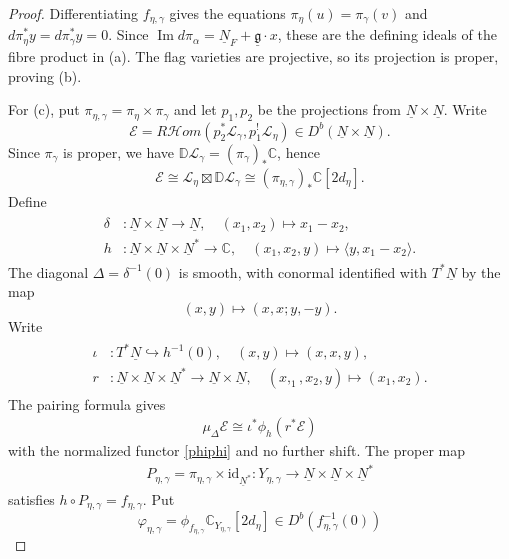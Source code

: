\documentclass[11pt,reqno]{amsart}
\theoremstyle{definition}
\theoremstyle{remark}
\def\bbC{\mathbb C}
\def\dN{\underline N}
\def\dg{\underline{\mathfrak g}}
\def\calE{\mathcal E}
\begin{document}
\begin{proof}
Differentiating $f_{\eta,\gamma}$ gives the equations
$\pi_\eta(u)=\pi_\gamma(v)$ and
$d\pi_\eta^*y=d\pi_\gamma^*y=0$.
Since $\operatorname{Im}d\pi_\alpha=\dN_F+\dg\cdot x$,
these are the defining ideals of the fibre product in (a).
The flag varieties are projective, so its projection is proper,
proving (b).

For (c), put $\pi_{\eta,\gamma}=\pi_\eta\times\pi_\gamma$ and
let $p_1,p_2$ be the projections from $\dN\times\dN$.
Write 
$$\calE=R\mathcal Hom(p_2^*\mathscr L_\gamma,p_1^!\mathscr L_\eta)\in D^b(\dN\times\dN).$$
Since $\pi_\gamma$ is proper, we have $\mathbb D\mathscr L_\gamma=(\pi_\gamma)_*\bbC$,
hence
\begin{align}\label{EPI}
 \mathcal E\cong\mathscr L_\eta\boxtimes\mathbb D\mathscr L_\gamma
 \cong(\pi_{\eta,\gamma})_*\bbC[2d_\eta].
\end{align}
Define
\begin{align}\label{DF}
\begin{split}
 \delta&:\dN\times\dN\to\dN,\quad(x_1,x_2)\mapsto x_1-x_2,\\
 h&:\dN\times\dN\times\dN^*\to\mathbb C,\quad (x_1,x_2,y)\mapsto\langle y,x_1-x_2\rangle.
 \end{split}
\end{align}
The diagonal $\Delta=\delta^{-1}(0)$ is smooth, with conormal
identified with $T^*\dN$ by the map 
$$(x,y)\mapsto(x,x;y,-y).$$
Write
\begin{align}\label{iota}
\begin{split}
 \iota&:T^*\dN\hookrightarrow h^{-1}(0),\quad(x,y)\mapsto(x,x,y),\\
 r&:\dN\times\dN\times\dN^*\to\dN\times\dN,\quad(x,_1,x_2,y)\mapsto (x_1,x_2).
 \end{split}
\end{align}
The pairing formula
\cite[Thm.~4.1, Def.~A.28, Rem.~A.30]{Sch25} gives
\begin{align}\label{MP}\mu_\Delta \calE\cong\iota^*\phi_h(r^*\calE)\end{align}
with the normalized functor \eqref{phiphi} and no further shift.
The proper map
\begin{align}\label{OP}
 P_{\eta,\gamma}=\pi_{\eta,\gamma}\times\mathrm{id}_{\dN^*}:
 Y_{\eta,\gamma}\longrightarrow\dN\times\dN\times\dN^*
\end{align}
satisfies $h\circ P_{\eta,\gamma}=f_{\eta,\gamma}$. Put
$$\varphi_{\eta,\gamma}=\phi_{f_{\eta,\gamma}}\bbC_{Y_{\eta,\gamma}}[2d_\eta]\in D^b(f_{\eta,\gamma}^{-1}(0))$$

\end{proof}
\end{document}
